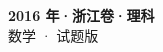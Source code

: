 \documentclass[zihao=-4, a4paper]{ctexart}
\begin{document}
\begin{center}
  {\Large\bfseries 2016 年·浙江卷·理科}\\[4pt]
  {\large 数学 · 试题版}
\end{center}
\medskip
{}

\end{document}
